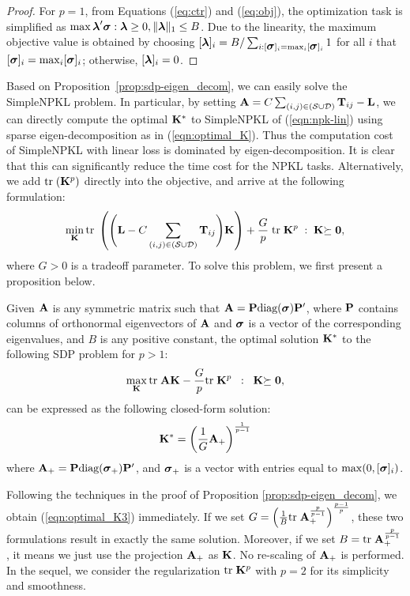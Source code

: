 \begin{proof}
For $p = 1$, from Equations (\ref{eq:ctr}) and (\ref{eq:obj}), the optimization task is
simplified as $\max \blambda'\bsigma :\blambda\geq 0,\| \blambda \|_1 \leq B$. Due to
the linearity, the maximum objective value is obtained by choosing $[\blambda]_i =
B/\sum_{i:[\bsigma]_i=\max_i[\bsigma]_i}1$ for all $i$ that $[\bsigma]_i = \max_i
[\bsigma]_i$; otherwise, $[\blambda]_i = 0$.
\end{proof}

Based on Proposition~\ref{prop:sdp-eigen_decom}, we can easily solve the
SimpleNPKL problem. In particular, by setting $\A=C\sum_{(i,j) \in
(\SS\cup\DD)}\T_{ij}-\L$, we can directly compute the optimal $\K^*$ to
SimpleNPKL of (\ref{eqn:npk-lin}) using sparse eigen-decomposition as in
(\ref{eqn:optimal_K}). Thus the computation cost of SimpleNPKL with linear loss is
dominated by eigen-decomposition. It is clear that this can significantly reduce the
time cost for the NPKL tasks. Alternatively, we  add $\tr(\K^p)$ directly into the
objective, and arrive at the following formulation:
\begin{eqnarray}
\min_{\K} \tr\left(\Bigg(\L - C\sum_{(i,j) \in (\SS\cup\DD)}
\T_{ij}\Bigg)\K\right)+\frac{G}{p} \;\tr\K^p\;:\;\K\psd, \nonumber
\end{eqnarray}
where  $G>0$ is a tradeoff parameter. To solve this problem, we first present a
proposition below.

\begin{prop}\label{prop:sdp-eigen-decom-2}
Given $\A$ is any symmetric matrix such that $\A=\P\diag(\bsigma)\P'$, where $\P$ contains columns of orthonormal
eigenvectors of $\A$ and $\bsigma$ is a vector of the corresponding
eigenvalues, and $B$ is any positive constant, the optimal solution
$\K^*$ to the following SDP problem for $p>1$:
\begin{eqnarray}\label{eqn:AB-sdp2}
\max_{\K}\tr \A\K - \frac{G}{p} \tr\K^p  \;\;:\;\;\K\psd,
\end{eqnarray}
can be expressed as the following closed-form solution:
\begin{equation}
\K^*=\left(\frac{1}{G}\A_+\right)^{\frac{1}{p-1}}\label{eqn:optimal_K3}
\end{equation}
where $\A_+=\P\diag(\bsigma_+)\P'$,  and $\bsigma_+$ is a vector with entries equal to $\max(0,[\bsigma]_i)$.
\end{prop}

Following the techniques in the proof of Proposition \ref{prop:sdp-eigen_decom}, we
obtain (\ref{eqn:optimal_K3}) immediately. If we set $G =
\left(\frac{1}{B}\tr\A_+^{\frac{p}{p-1}}\right)^{\frac{p-1}{p}}$, these two
formulations result in exactly the same solution. Moreover, if we set $B =
\tr\A_+^{\frac{p}{p-1}}$, it means we just use the projection $\A_+$ as $\K$. No
re-scaling of $\A_+$ is performed. In the sequel, we consider the regularization $\tr
\K^p$ with $p = 2$ for its simplicity and smoothness.

